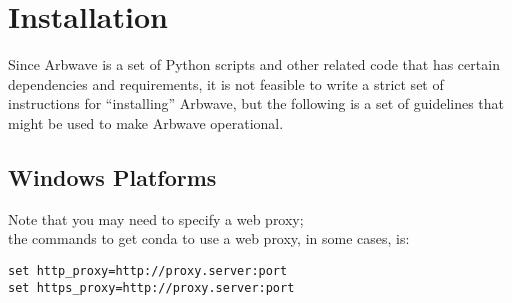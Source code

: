 \section{Installation}
Since Arbwave is a set of Python scripts and other related code that has certain 
dependencies and requirements,
it is not feasible to write a strict set of instructions for ``installing'' Arbwave,
but the following is a set of guidelines that might be used to make Arbwave operational.

\subsection{Windows Platforms}

Note that you may need to specify a web proxy;\\
the commands to get conda to use a web proxy, in some cases, is:
\begin{verbatim}
set http_proxy=http://proxy.server:port
set https_proxy=http://proxy.server:port
\end{verbatim}


